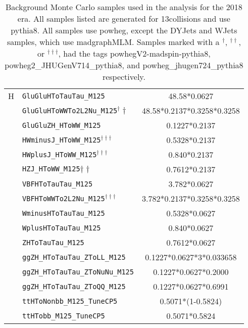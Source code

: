 \begin{table}[ht]
\begin{center}
{\begin{tabular}{|c|l|c|}
    \hline
    H & \texttt{GluGluHToTauTau\_M125} & 48.58*0.0627\\
    & \texttt{GluGluHToWWTo2L2Nu\_M125}$^\dagger\dagger$ & 48.58*0.2137*0.3258*0.3258\\
    & \texttt{GluGluZH\_HToWW\_M125} & 0.1227*0.2137\\
    & \texttt{HWminusJ\_HToWW\_M125}$^{\dagger\dagger\dagger}$ & 0.5328*0.2137\\
    & \texttt{HWplusJ\_HToWW\_M125}$^{\dagger\dagger\dagger}$ & 0.840*0.2137\\
    & \texttt{HZJ\_HToWW\_M125}${\dagger\dagger}$ & 0.7612*0.2137\\
    & \texttt{VBFHToTauTau\_M125} & 3.782*0.0627\\
    & \texttt{VBFHToWWTo2L2Nu\_M125}$^{\dagger\dagger\dagger}$ & 3.782*0.2137*0.3258*0.3258\\
    & \texttt{WminusHToTauTau\_M125} & 0.5328*0.0627\\
    & \texttt{WplusHToTauTau\_M125} & 0.840*0.0627\\
    & \texttt{ZHToTauTau\_M125} & 0.7612*0.0627\\
    & \texttt{ggZH\_HToTauTau\_ZToLL\_M125} & 0.1227*0.0627*3*0.033658\\
    & \texttt{ggZH\_HToTauTau\_ZToNuNu\_M125} & 0.1227*0.0627*0.2000\\
    & \texttt{ggZH\_HToTauTau\_ZToQQ\_M125} & 0.1227*0.0627*0.6991\\
    & \texttt{ttHToNonbb\_M125\_TuneCP5} & 0.5071*(1-0.5824)\\
    & \texttt{ttHTobb\_M125\_TuneCP5} & 0.5071*0.5824\\
    \hline
    \end{tabular}
    }
    \end{center}
    \caption{Background Monte Carlo samples used in the analysis for the 2018 era. All samples listed are generated for 13\TeV collisions and use pythia8. All samples use powheg, except the DYJets and WJets samples, which use madgraphMLM. Samples marked with a $^\dagger$, $^{\dagger\dagger}$, or $^{\dagger\dagger\dagger}$, had the tags powhegV2-madspin-pythia8, powheg2\_JHUGenV714\_pythia8, and powheg\_jhugen724\_pythia8 respectively.}
    \label{tab:2018mcbkg}
    \end{table}
    
    


